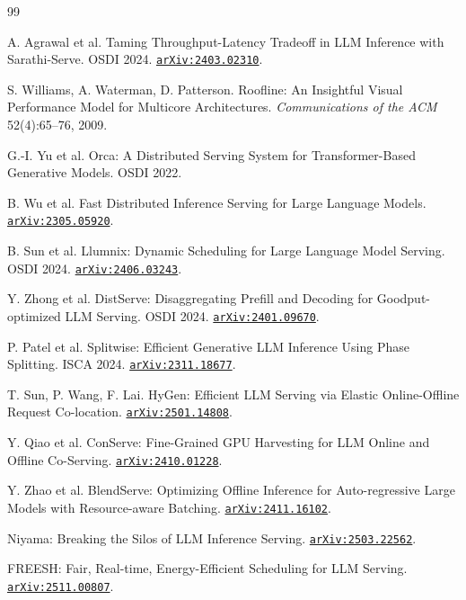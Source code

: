 \documentclass[11pt]{article}
\newcommand{\code}[1]{\texttt{#1}}
\begin{document}
\begin{thebibliography}{99}
\small

 A. Agrawal et al. Taming Throughput-Latency Tradeoff in LLM Inference with
Sarathi-Serve. OSDI 2024. \href{https://arxiv.org/abs/2403.02310}{\code{arXiv:2403.02310}}.

 S. Williams, A. Waterman, D. Patterson. Roofline: An Insightful Visual
Performance Model for Multicore Architectures. \emph{Communications of the ACM}
52(4):65--76, 2009.

 G.-I. Yu et al. Orca: A Distributed Serving System for Transformer-Based
Generative Models. OSDI 2022.

 B. Wu et al. Fast Distributed Inference Serving for Large Language
Models. \href{https://arxiv.org/abs/2305.05920}{\code{arXiv:2305.05920}}.

 B. Sun et al. Llumnix: Dynamic Scheduling for Large Language Model
Serving. OSDI 2024. \href{https://arxiv.org/abs/2406.03243}{\code{arXiv:2406.03243}}.

 Y. Zhong et al. DistServe: Disaggregating Prefill and Decoding for
Goodput-optimized LLM Serving. OSDI 2024.
\href{https://arxiv.org/abs/2401.09670}{\code{arXiv:2401.09670}}.

 P. Patel et al. Splitwise: Efficient Generative LLM Inference Using
Phase Splitting. ISCA 2024. \href{https://arxiv.org/abs/2311.18677}{\code{arXiv:2311.18677}}.

 T. Sun, P. Wang, F. Lai. HyGen: Efficient LLM Serving via Elastic
Online-Offline Request Co-location.
\href{https://arxiv.org/abs/2501.14808}{\code{arXiv:2501.14808}}.

 Y. Qiao et al. ConServe: Fine-Grained GPU Harvesting for LLM Online and
Offline Co-Serving. \href{https://arxiv.org/abs/2410.01228}{\code{arXiv:2410.01228}}.

 Y. Zhao et al. BlendServe: Optimizing Offline Inference for
Auto-regressive Large Models with Resource-aware Batching.
\href{https://arxiv.org/abs/2411.16102}{\code{arXiv:2411.16102}}.

 Niyama: Breaking the Silos of LLM Inference Serving.
\href{https://arxiv.org/abs/2503.22562}{\code{arXiv:2503.22562}}.

 FREESH: Fair, Real-time, Energy-Efficient Scheduling for LLM Serving.
\href{https://arxiv.org/abs/2511.00807}{\code{arXiv:2511.00807}}.


\end{thebibliography}
\end{document}
